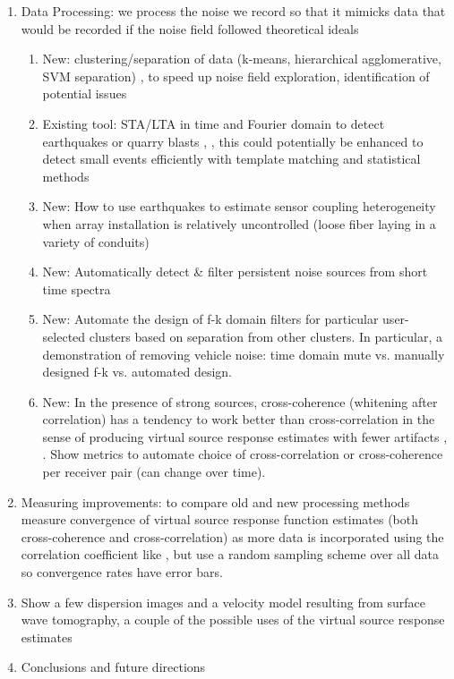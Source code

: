 \documentclass[11pt]{article}
\begin{document}
\begin{enumerate}
	\vspace{-0.4cm}
	\item Data Processing: we process the noise we record so that it mimicks data that would be recorded if the noise field followed theoretical ideals \cite{Bensen2007}
		\begin{enumerate}
		\vspace{-0.3cm}
		\item New: clustering/separation of data (k-means, hierarchical agglomerative, SVM separation) \cite{Liao2005}, \cite{Hastie2009} to speed up noise field exploration, identification of potential issues
		\vspace{-0.1cm}
		\item Existing tool: STA/LTA \cite{Withers1998} in time and Fourier domain to detect earthquakes or quarry blasts \cite{Bensen2007}, \cite{Girard2016}, this could potentially be enhanced to detect small events efficiently with template matching and statistical methods \cite{Yoon2015}
		\vspace{-0.1cm}
		\item New: How to use earthquakes to estimate sensor coupling heterogeneity when array installation is relatively uncontrolled (loose fiber laying in a variety of conduits) 
		\vspace{-0.1cm}
		\item New: Automatically detect \& filter persistent noise sources from short time spectra
		\vspace{-0.1cm}
		\item New: Automate the design of f-k domain filters for particular user-selected clusters based on separation from other clusters. In particular, a demonstration of removing vehicle noise: time domain mute vs. manually designed f-k vs. automated design. 
		\vspace{-0.1cm}
		\item New: In the presence of strong sources, cross-coherence (whitening after correlation) has a tendency to work better than cross-correlation in the sense of producing virtual source response estimates with fewer artifacts \cite{Nakata2011}, \cite{Martin2016}. Show metrics to automate choice of cross-correlation or cross-coherence per receiver pair (can change over time).
		\end{enumerate}
	\vspace{-0.5cm}
	\item Measuring improvements: to compare old and new processing methods measure convergence of virtual source response function estimates (both cross-coherence and cross-correlation) as more data is incorporated using the correlation coefficient like \cite{Seats2012}, but use a random sampling scheme over all data so convergence rates have error bars.
	\vspace{-0.3cm}
	\item Show a few dispersion images and a velocity model resulting from surface wave tomography, a couple of the possible uses of the virtual source response estimates
	\vspace{-0.3cm}
	\item Conclusions and future directions
	\end{enumerate}
\end{document}
